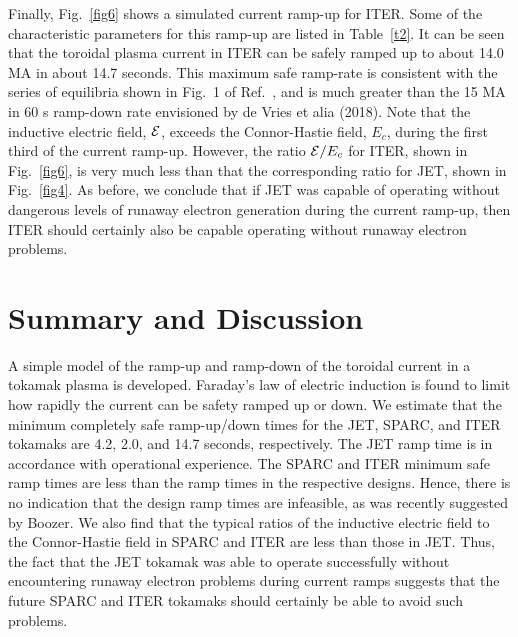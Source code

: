 \documentclass[12pt,prb,aps]{revtex4-1}
\begin{document}
Finally, Fig.~\ref{fig6} shows a simulated current ramp-up for ITER. Some of the characteristic  parameters for this ramp-up are listed in Table~\ref{t2}. 
It can be seen that the toroidal plasma current in ITER can be safely ramped up to about 14.0 MA in about 14.7 seconds. This maximum safe ramp-rate is 
consistent with the series of equilibria shown in Fig.~1 of Ref.~, and is much greater than the 15 MA in 60 s ramp-down rate envisioned by de Vries et alia (2018).\cite{deVries}
Note that the inductive electric field, ${\cal E}$,  exceeds the Connor-Hastie field, $E_c$,  during the first third of the current ramp-up. However,  the ratio ${\cal E}/E_c$ for ITER, 
shown  in Fig.~\ref{fig6}, is very much less than that the corresponding ratio for JET,  shown in Fig.~\ref{fig4}. As before, we conclude that if JET was capable of
operating without dangerous levels of runaway electron generation during the current ramp-up, then ITER
should certainly also be capable operating without runaway electron problems.  

\section{Summary and Discussion}
A simple model of the ramp-up and ramp-down of the toroidal current in a tokamak plasma is developed. Faraday's law of electric induction is found to 
limit how rapidly the current can be safety ramped up or down. We estimate that the minimum completely safe ramp-up/down times for the JET, SPARC, and
ITER tokamaks are 4.2, 2.0, and 14.7 seconds, respectively. The JET ramp time is in accordance with operational experience. The SPARC
and ITER minimum safe ramp times are less than the ramp times in the respective designs. Hence, there is no indication that the design ramp times are infeasible, as was recently 
suggested by Boozer.\cite{boozer}
We also find that the typical ratios of the inductive electric field
to the Connor-Hastie field in SPARC and ITER are less than those in JET. Thus, the fact that the JET tokamak was able to operate successfully
without encountering runaway electron problems during  current ramps suggests that the future SPARC and ITER tokamaks should certainly be able to
avoid such problems. 
\end{document}
